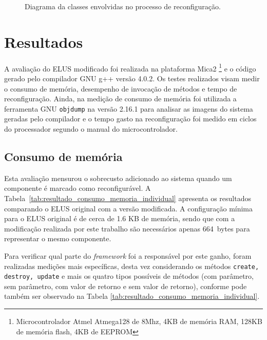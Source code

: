 \documentclass[12pt]{article}
\newcommand{\fig}[4][h]{
  \begin{figure}[#1] {\centering{\texttt{[image: fig/\#2]}}\par}
    \caption{#3\label{fig:#2}}
  \end{figure}
}
\begin{document}
\fig{diagramaClasse.pdf}{Diagrama da classes envolvidas no processo de reconfiguração.}{scale=.35}

\section{Resultados}
\label{sec:resultados}
A avaliação do ELUS modificado foi realizada na plataforma Mica2 \footnote{Microcontrolador Atmel Atmega128 de 8Mhz, 4KB de memória RAM, 128KB de memória flash, 4KB de EEPROM} e o código gerado pelo compilador GNU g++ versão 4.0.2. Os testes realizados visam medir o consumo de memória, desempenho de invocação de métodos e tempo de reconfiguração. Ainda, na medição de consumo de memória foi utilizada a ferramenta GNU \texttt{objdump} na versão 2.16.1 para analisar as imagens do sistema geradas pelo compilador e o tempo gasto na reconfiguração foi medido em ciclos do processador segundo o manual do microcontrolador.

\subsection{Consumo de memória}
Esta avaliação mensurou o sobrecusto adicionado ao sistema quando um componente é marcado como reconfigurável. A Tabela~\ref{tab:resultado_consumo_memoria_individual} apresenta os resultados comparando o ELUS original com a versão modificada. A configuração mínima para o ELUS original é de cerca de 1.6 KB de memória, sendo que com a modificação realizada por este trabalho são necessários apenas 664~bytes para representar o mesmo componente.

Para verificar qual parte do \textit{framework} foi a responsável por este ganho, foram realizadas medições mais específicas, desta vez considerando os métodos \texttt{create, destroy, update} e mais os quatro tipos possíveis de métodos (com parâmetro, sem parâmetro, com valor de retorno e sem valor de retorno), conforme pode também ser observado na Tabela \ref{tab:resultado_consumo_memoria_individual}.
\end{document}
